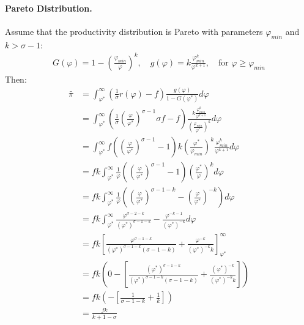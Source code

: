 \begin{solution}
    \paragraph{Pareto Distribution.} Assume that the productivity distribution is Pareto with parameters $\varphi_{min}$ and $k > \sigma - 1$:
    \begin{align*}
        G(\varphi) = 1 - \left( \frac{\varphi_{min}}{\varphi} \right)^k, \quad g(\varphi) = k \frac{\varphi_{min}^k}{\varphi^{k+1}}, \quad \text{for } \varphi \geq \varphi_{min}
    \end{align*}
    Then:
    \begin{align*}
        \bar{\pi} &= \int_{\varphi^*}^{\infty} \left( \frac{1}{\sigma} r(\varphi) - f \right) \frac{g(\varphi)}{1 - G(\varphi^*)} d\varphi \\
        &= \int_{\varphi^*}^{\infty} \left( \frac{1}{\sigma} \left(\frac{\varphi}{\varphi^*}\right)^{\sigma - 1} \sigma f - f \right) \frac{k \frac{\varphi_{min}^k}{\varphi^{k+1}}}{\left( \frac{\varphi_{min}}{\varphi^*} \right)^k} d\varphi \\
        &= \int_{\varphi^*}^{\infty} f \left( \left(\frac{\varphi}{\varphi^*}\right)^{\sigma - 1} - 1 \right) k \left(\frac{\varphi^*}{\varphi_{min}}\right)^k \frac{\varphi_{min}^k}{\varphi^{k+1}} d\varphi \\
        &= f k \int_{\varphi^*}^{\infty} \frac{1}{\varphi}\left( \left(\frac{\varphi}{\varphi^*}\right)^{\sigma - 1} - 1 \right) \left(\frac{\varphi^*}{\varphi}\right)^k d\varphi \\
        &= f k \int_{\varphi^*}^{\infty} \frac{1}{\varphi}\left( \left(\frac{\varphi}{\varphi^*}\right)^{\sigma - 1 - k} - \left(\frac{\varphi}{\varphi^*}\right)^{-k} \right) d\varphi \\
        &= f k \int_{\varphi^*}^{\infty} \frac{\varphi^{\sigma - 2 - k}}{(\varphi^*)^{\sigma - 1 - k}} - \frac{\varphi^{-k - 1}}{(\varphi^*)^{-k}} d\varphi \\
        &= f k \left[ \frac{\varphi^{\sigma - 1 - k}}{(\varphi^*)^{\sigma - 1 - k} (\sigma - 1 - k)} + \frac{\varphi^{-k}}{(\varphi^*)^{-k} k} \right]_{\varphi^*}^{\infty} \\
        &= f k \left( 0 - \left[ \frac{(\varphi^*)^{\sigma - 1 - k}}{(\varphi^*)^{\sigma - 1 - k} (\sigma - 1 - k)} + \frac{(\varphi^*)^{-k}}{(\varphi^*)^{-k} k} \right] \right) \\
        &= f k \left( - \left[ \frac{1}{\sigma - 1 - k} + \frac{1}{k} \right] \right) \\
        &= \frac{fk}{k + 1 - \sigma}

\end{align*}
\end{solution}
